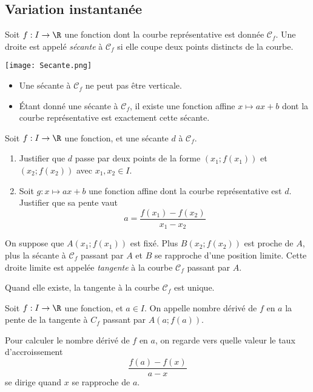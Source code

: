 \documentclass{article}
\begin{document}
\subsection{Variation instantanée}
\begin{definition}
Soit $f : I \to \R$ une fonction dont la courbe représentative est donnée $\mathcal{C}_f$. Une droite est appelé \emph{sécante} à $\mathcal{C}_f$ si elle coupe deux points distincts de la courbe.
\end{definition}
\begin{center}
\texttt{[image: Secante.png]}    
\end{center}
\begin{remark}
\begin{itemize}
\item Une sécante à $\mathcal{C}_f$ ne peut pas être verticale.
\item \'Etant donné une sécante à $\mathcal{C}_f$, il existe une fonction affine $x \mapsto ax + b$ dont la courbe représentative est exactement cette sécante. 
\end{itemize}
\end{remark}
\begin{exercize}
Soit $f : I \to \R$ une fonction, et une sécante $d$ à $\mathcal{C}_f$.
\begin{enumerate}[label=\emph{\alph*)}]
\item Justifier que $d$ passe par deux points de la forme $(x_1;f(x_1))$ et $(x_2;f(x_2))$ avec $x_1,x_2 \in I$.
\item Soit $g:x \mapsto ax + b$ une fonction affine dont la courbe représentative est $d$. Justifier que sa pente vaut
\begin{equation*}
a = \dfrac{f(x_1)-f(x_2)}{x_1-x_2}    
\end{equation*}  
\end{enumerate} 
\end{exercize}
\emptybox{3cm}
\begin{tcolorbox}
On suppose que $A(x_1;f(x_1))$ est fixé. Plus $B(x_2;f(x_2))$ est proche de $A$, plus la sécante à $\mathcal{C}_f$ passant par $A$ et $B$ se rapproche d'une position limite. Cette droite limite est appelée \emph{tangente} à la courbe $\mathcal{C}_f$ passant par $A$. 
\end{tcolorbox}
\begin{remark}
Quand elle existe, la tangente à la courbe $\mathcal{C}_f$ est unique.
\end{remark}
\begin{definitionbox}
Soit $f : I \to \R$ une fonction, et $a \in I$. On appelle nombre dérivé de $f$ en $a$ la pente de la tangente à $C_f$ passant par $A(a;f(a))$.
\end{definitionbox}
\begin{remark}
Pour calculer le nombre dérivé de $f$ en $a$, on regarde vers quelle valeur le taux d'accroissement
\begin{equation*}
\dfrac{f(a)-f(x)}{a-x}    
\end{equation*}
se dirige quand $x$ se rapproche de $a$.
\end{remark}
\newpage
\end{document}
